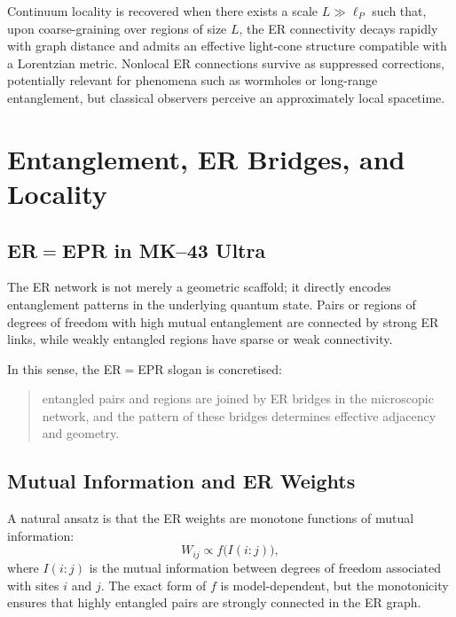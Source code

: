 Continuum locality is recovered when there exists a scale $L\gg \ell_P$ such that, upon coarse-graining over regions of size $L$, the ER connectivity decays rapidly with graph distance and admits an effective light-cone structure compatible with a Lorentzian metric.
Nonlocal ER connections survive as suppressed corrections, potentially relevant for phenomena such as wormholes or long-range entanglement, but classical observers perceive an approximately local spacetime.


\chapter{Entanglement, ER Bridges, and Locality}

\section{ER$=$EPR in MK--43 Ultra}

The ER network is not merely a geometric scaffold; it directly encodes entanglement patterns in the underlying quantum state.
Pairs or regions of degrees of freedom with high mutual entanglement are connected by strong ER links, while weakly entangled regions have sparse or weak connectivity.

In this sense, the ER$=$EPR slogan is concretised:
\begin{quote}
  entangled pairs and regions are joined by ER bridges in the microscopic network, and the pattern of these bridges determines effective adjacency and geometry.
\end{quote}

\section{Mutual Information and ER Weights}

A natural ansatz is that the ER weights are monotone functions of mutual information:
\[
  W_{ij} \propto f\big(I(i:j)\big),
\]
where $I(i:j)$ is the mutual information between degrees of freedom associated with sites $i$ and $j$.
The exact form of $f$ is model-dependent, but the monotonicity ensures that highly entangled pairs are strongly connected in the ER graph.

